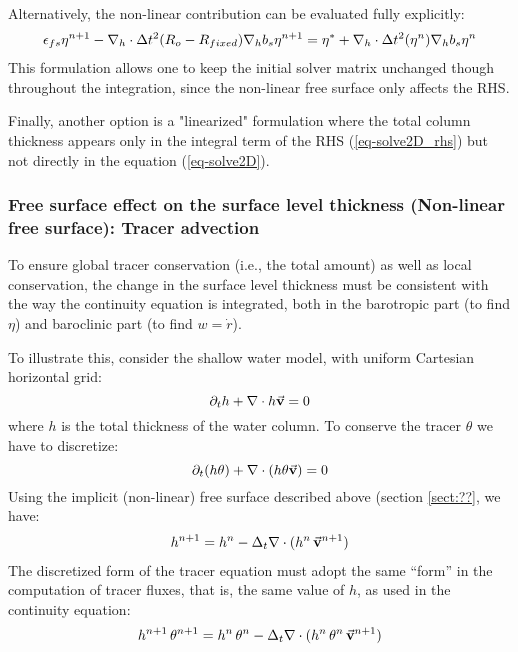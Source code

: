 Alternatively, the non-linear contribution can be evaluated fully
explicitly:
\begin{eqnarray*}
\epsilon_{fs} {\eta}^{n+1} -
{\bf \nabla}_h \cdot \Delta t^2 (R_o-R_{fixed})
{\bf \nabla}_h b_s {\eta}^{n+1}
= {\eta}^*
+{\bf \nabla}_h \cdot \Delta t^2 (\eta^{n})
{\bf \nabla}_h b_s {\eta}^{n}
\end{eqnarray*} 
This formulation allows one to keep the initial solver matrix
unchanged though throughout the integration, since the non-linear free
surface only affects the RHS.

Finally, another option is a "linearized" formulation where the total
column thickness appears only in the integral term of the RHS
(\ref{eq-solve2D_rhs}) but not directly in the equation
(\ref{eq-solve2D}).


\subsubsection{Free surface effect on the surface level thickness
(Non-linear free surface): Tracer advection}
\label{sect:freesurf-tracer-advection}

To ensure global tracer conservation (i.e., the total amount) as well
as local conservation, the change in the surface level thickness must
be consistent with the way the continuity equation is integrated, both
in the barotropic part (to find $\eta$) and baroclinic part (to find
$w = \dot{r}$).

To illustrate this, consider the shallow water model, with uniform
Cartesian horizontal grid:
$$
\partial_t h + \nabla \cdot h \vec{\bf v} = 0
$$
where $h$ is the total thickness of the water column.
To conserve the tracer $\theta$ we have to discretize:
$$
\partial_t (h \theta) + \nabla \cdot ( h \theta \vec{\bf v})= 0
$$
Using the implicit (non-linear) free surface described above (section
\ref{sect:??}, we have:
\begin{eqnarray*}
h^{n+1} = h^{n} - \Delta_t \nabla \cdot (h^n \, \vec{\bf v}^{n+1} ) \\
\end{eqnarray*}
The discretized form of the tracer equation must adopt the same
``form'' in the computation of tracer fluxes, that is, the same value
of $h$, as used in the continuity equation:
\begin{eqnarray*}
h^{n+1} \, \theta^{n+1} = h^n \, \theta^n 
        - \Delta_t \nabla \cdot (h^n \, \theta^n \, \vec{\bf v}^{n+1})
\end{eqnarray*}

